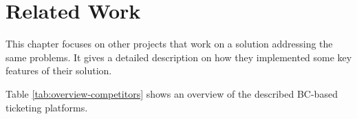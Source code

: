 \chapter{Related Work}
This chapter focuses on other projects that work on a solution addressing the same problems. It gives a detailed description on how they implemented some key features of their solution. 


Table \ref{tab:overview-competitors} shows an overview of the described BC-based ticketing platforms.







